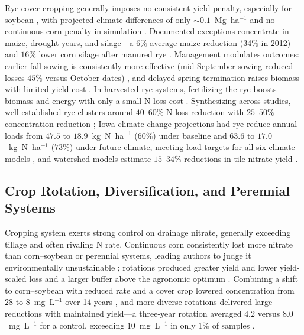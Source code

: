\documentclass[11pt]{article}
\begin{document}
Rye cover cropping generally imposes no consistent yield penalty, especially
for soybean \parencite{Strock2004,Waring2020,Qi2011b}, with projected-climate
differences of only $\sim0.1$~Mg~ha$^{-1}$ and no continuous-corn penalty in
simulation \parencite{Malone2020,Birru2023}. Documented exceptions concentrate
in maize, drought years, and silage---a $6\%$ average maize reduction (34\% in
2012) \parencite{MartinezFeria2016} and $16\%$ lower corn silage after manured
rye \parencite{Krueger2013}. Management modulates outcomes: earlier fall
sowing is consistently more effective (mid-September sowing reduced losses
$45\%$ versus October dates) \parencite{Feyereisen2006b}, and delayed spring
termination raises biomass with limited yield cost \parencite{Birru2023,Chatterjee2025}.
In harvested-rye systems, fertilizing the rye boosts biomass and energy with
only a small N-loss cost \parencite{Malone2018,Malone2023}. Synthesizing
across studies, well-established rye clusters around $40$--$60\%$ N-loss
reduction with $25$--$50\%$ concentration reduction
\parencite{Malone2018,Chatterjee2025,Malone2014b,Malone2023}; Iowa
climate-change projections had rye reduce annual loads from $47.5$ to
$18.9$~kg~N~ha$^{-1}$ ($60\%$) under baseline and $63.6$ to
$17.0$~kg~N~ha$^{-1}$ ($73\%$) under future climate, meeting load targets for
all six climate models \parencite{Malone2020}, and watershed models estimate
$15$--$34\%$ reductions in tile nitrate yield
\parencite{David2015,Makhtoumi2025,Gupta2023}.

\subsection{Crop Rotation, Diversification, and Perennial Systems}

Cropping system exerts strong control on drainage nitrate, generally
exceeding tillage and often rivaling N rate. Continuous corn consistently lost
more nitrate than corn--soybean or perennial systems, leading authors to judge
it environmentally unsustainable \parencite{Weed1996,Kanwar1997}; rotations
produced greater yield and lower yield-scaled loss and a larger buffer above
the agronomic optimum \parencite{Zhao2016,Pasley2021}. Combining a shift to
corn--soybean with reduced rate and a cover crop lowered concentration from
$28$ to $8$~mg~L$^{-1}$ over 14 years \parencite{Ritter2015}, and more diverse
rotations delivered large reductions with maintained yield---a three-year
rotation averaged $4.2$ versus $8.0$~mg~L$^{-1}$ for a control, exceeding
$10$~mg~L$^{-1}$ in only $1\%$ of samples \parencite{Gentry2025,Ahmed2007b}.
\end{document}
